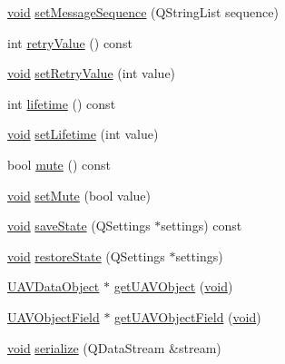 \begin{DoxyCompactItemize}
\item 
\hyperlink{group___u_a_v_objects_plugin_ga444cf2ff3f0ecbe028adce838d373f5c}{void} \hyperlink{group___notify_plugin_gad8bface53f8c0b678ba53efa7607c644}{set\-Message\-Sequence} (\-Q\-String\-List sequence)
\item 
int \hyperlink{group___notify_plugin_gad3ef16c40fa24c6362f0a5b8dcf7106a}{retry\-Value} () const 
\item 
\hyperlink{group___u_a_v_objects_plugin_ga444cf2ff3f0ecbe028adce838d373f5c}{void} \hyperlink{group___notify_plugin_gace1ba5eab850d1945aeede024e405463}{set\-Retry\-Value} (int value)
\item 
int \hyperlink{group___notify_plugin_ga2a7280994bcb9184ba2a3de6aa2d9dd7}{lifetime} () const 
\item 
\hyperlink{group___u_a_v_objects_plugin_ga444cf2ff3f0ecbe028adce838d373f5c}{void} \hyperlink{group___notify_plugin_gab8ee00149d5b8c0a74ff7fc134bdbd4c}{set\-Lifetime} (int value)
\item 
bool \hyperlink{group___notify_plugin_ga815fa2051096a7c2f3074c60afad5d47}{mute} () const 
\item 
\hyperlink{group___u_a_v_objects_plugin_ga444cf2ff3f0ecbe028adce838d373f5c}{void} \hyperlink{group___notify_plugin_ga45781a8ec6285e780f592f1b3952b407}{set\-Mute} (bool value)
\item 
\hyperlink{group___u_a_v_objects_plugin_ga444cf2ff3f0ecbe028adce838d373f5c}{void} \hyperlink{group___notify_plugin_ga9ba0eb664828ae93d16faaa783b77cfc}{save\-State} (\-Q\-Settings $\ast$settings) const 
\item 
\hyperlink{group___u_a_v_objects_plugin_ga444cf2ff3f0ecbe028adce838d373f5c}{void} \hyperlink{group___notify_plugin_gad7dea9a755d75cd820f3b06131f52a1d}{restore\-State} (\-Q\-Settings $\ast$settings)
\item 
\hyperlink{class_u_a_v_data_object}{\-U\-A\-V\-Data\-Object} $\ast$ \hyperlink{group___notify_plugin_ga5f16bd85e4ffd982c71b75abbb00833d}{get\-U\-A\-V\-Object} (\hyperlink{group___u_a_v_objects_plugin_ga444cf2ff3f0ecbe028adce838d373f5c}{void})
\item 
\hyperlink{class_u_a_v_object_field}{\-U\-A\-V\-Object\-Field} $\ast$ \hyperlink{group___notify_plugin_gad80a60dd673d057f2fdd45e79f8b8905}{get\-U\-A\-V\-Object\-Field} (\hyperlink{group___u_a_v_objects_plugin_ga444cf2ff3f0ecbe028adce838d373f5c}{void})
\item 
\hyperlink{group___u_a_v_objects_plugin_ga444cf2ff3f0ecbe028adce838d373f5c}{void} \hyperlink{group___notify_plugin_gad39b4705bd8ee634abb8a8922450613b}{serialize} (\-Q\-Data\-Stream \&stream)

\end{DoxyCompactItemize}
